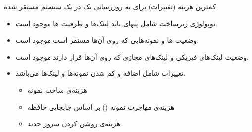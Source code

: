 \documentclass{beamer}
\makeatletter
\newcommand{\RTList}{\raggedleft\rightskip\@totalleftmargin}
\makeatother
\begin{document}
\begin{persian}
\begin{frame}
	\par
	کمترین هزینه (تغییرات) برای به روزرسانی یک 
	در یک سیستم مستقر شده
\end{frame}
\begin{frame}
	\begin{itemize}\RTList
		\item توپولوژی زیرساخت شامل پنهای باند لینک‌ها و ظرفیت ها موجود است.
		\item وضعیت ها و نمونه‌هایی که روی آن‌ها مستقر است موجود است.
		\item وضعیت لینک‌های فیزیکی و لینک‌های مجازی که روی آن‌ها قرار دارند موجود است.
		\item تغییرات شامل اضافه و کم شدن نمونه‌ها و لینک‌ها می‌باشد.
		\begin{itemize}\RTList
			\item هزینه‌ی ساخت نمونه
			\item هزینه‌ی مهاجرت نمونه () بر اساس جابجایی حافظه
			\item هزینه‌ی روشن کردن سرور جدید
		\end{itemize}
	\end{itemize}
\end{frame}
\end{persian}
\end{document}
